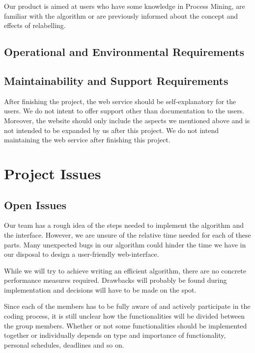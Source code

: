 \documentclass[notitlepage]{article}
\begin{document}
\begin{flushleft}
Our product is aimed at users who have some knowledge in Process Mining, are familiar with the algorithm or are previously informed about the concept and effects of relabelling.





\subsection{Operational and Environmental Requirements}

\subsection{Maintainability and Support Requirements}

After finishing the project, the web service should be self-explanatory for the users. We do not intent to offer support other than documentation to the users. Moreover, the website should only include the aspects we mentioned above and is not intended to be expanded by us after this project. We do not intend maintaining the web service after finishing this project.


\section{Project Issues}

\subsection{Open Issues}
Our team has a rough idea of the steps needed to implement the algorithm and the interface.
However, we are unsure of the relative time needed for each of these parts.
Many unexpected bugs in our algorithm could hinder the time we have in our disposal to design a user-friendly web-interface.

While we will try to achieve writing an efficient algorithm, there are no concrete performance measures required.
Drawbacks will probably be found during implementation and decisions will have to be made on the spot.

Since each of the members has to be fully aware of and actively participate in the coding process, it is still unclear how the functionalities will be divided between the group members.
Whether or not some functionalities should be implemented together or individually depends on type and importance of functionality, personal schedules, deadlines and so on.







\end{flushleft}
\end{document}
